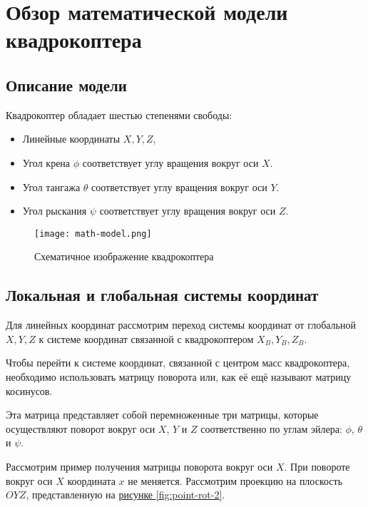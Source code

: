 \chapter{Обзор математической модели квадрокоптера}
\label{ch:chap2}

\section{Описание модели}

Квадрокоптер обладает шестью степенями свободы:

\begin{itemize}
    \item Линейные координаты $X, Y, Z$,
    \item Угол крена \(\phi\) соответствует углу вращения вокруг оси \(X\). 
    \item Угол тангажа \(\theta\) соответствует углу вращения вокруг оси \(Y\).
    \item  Угол рыскания \(\psi\) соответствует углу вращения вокруг оси \(Z\).
\end{itemize}

\begin{figure}[ht]
    \centering
    \texttt{[image: math-model.png]}
    \caption{Схематичное изображение квадрокоптера}
\end{figure}

\section{Локальная и глобальная системы координат}

Для линейных координат рассмотрим переход системы координат от 
глобальной \(X,Y,Z\) к системе координат связанной с квадрокоптером \(X_B,Y_B,Z_B\).

Чтобы перейти к системе координат, связанной с центром масс квадрокоптера, необходимо 
использовать матрицу поворота или, как её ещё называют матрицу косинусов.

Эта матрица представляет собой перемноженные три матрицы, которые осуществляют 
поворот вокруг оси \(X\), \(Y\) и \(Z\) соответственно по углам эйлера: \(\phi\), \(\theta\) и \(\psi\).

Рассмотрим пример получения матрицы поворота вокруг оси \(X\). 
При повороте вокруг оси \(X\) координата \(x\) не меняется.
Рассмотрим проекцию на плоскость \(OYZ\), представленную на \hyperref[fig:point-rot]{рисунке \ref*{fig:point-rot-2}}.

